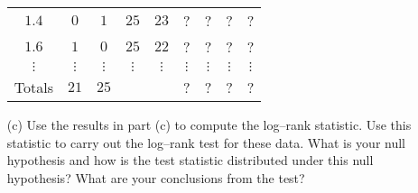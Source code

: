 \documentclass[12pt]{article}
\begin{document}
\begin{itemize}
\begin{center}
\begin{tabular}{ c | c c | c c | c c | c c }
 $1.4$ & $0$ & $1$ & $25$ & $23$    & ? & ? & ? & ? \\
 
 $1.6$ & $1$ & $0$ & $25$ & $22$    & ? & ? & ? & ? \\
 
 $\vdots$ & $\vdots$ & $\vdots$ & $\vdots$ & $\vdots$    & $\vdots$ & $\vdots$ & $\vdots$ & $\vdots$ \\
 
 \hline
 
 Totals & $21$ & $25$ & &    & ? & ? & ? & ?
\end{tabular}
\end{center}

	\item[(c)] Use the results in part (c) to compute the log–rank statistic. Use this statistic to carry out the log–rank test for these data. What is your null hypothesis and how is the test statistic distributed under this null hypothesis? What are your conclusions from the test?
\end{itemize}
\end{document}
